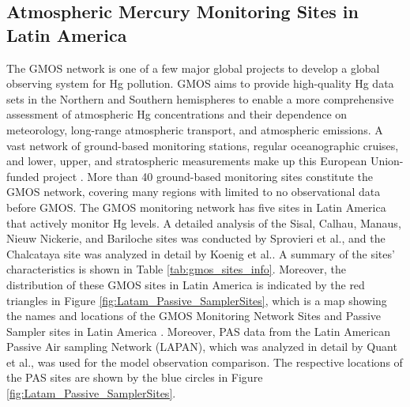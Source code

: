 \subsection{Atmospheric Mercury Monitoring Sites in Latin America} \label{c2_monitoring_site_characteristics}
\begin{flushleft}
 The GMOS network is one of a few major global projects to develop a global observing system for Hg pollution. GMOS aims to provide high-quality Hg data sets in the Northern and Southern hemispheres to enable a more comprehensive assessment of atmospheric Hg concentrations and their dependence on meteorology, long-range atmospheric transport, and atmospheric emissions\cite{sprovieri_atmospheric_2016}. A vast network of ground-based monitoring stations, regular oceanographic cruises, and lower, upper, and stratospheric measurements make up this European Union-funded project \cite{koenig_seasonal_2021,sprovieri_atmospheric_2016}. More than 40 ground-based monitoring sites constitute the GMOS network, covering many regions with limited to no observational data before GMOS\cite{sprovieri_atmospheric_2016}. The GMOS monitoring network has five sites in Latin America that actively monitor Hg levels. A detailed analysis of the Sisal, Calhau, Manaus, Nieuw Nickerie, and Bariloche sites was conducted by Sprovieri et al.\cite{sprovieri_atmospheric_2016}, and the Chalcataya site was analyzed in detail by Koenig et al.\cite{koenig_seasonal_2021}. A summary of the sites' characteristics is shown in Table \ref{tab:gmos_sites_info}. Moreover, the distribution of these GMOS sites in Latin America is indicated by the red triangles in Figure \ref{fig:Latam_Passive_SamplerSites}, which is a map showing the names and locations of the GMOS Monitoring Network Sites and Passive Sampler sites in Latin America \cite{quant_measuring_2021,koenig_seasonal_2021}. Moreover, PAS data from the Latin American Passive Air sampling Network (LAPAN), which was analyzed in detail by Quant et al.\cite{quant_measuring_2021}, was used for the model observation comparison. The respective locations of the PAS sites are shown by the blue circles in Figure \ref{fig:Latam_Passive_SamplerSites}.
  \end{flushleft}
  
